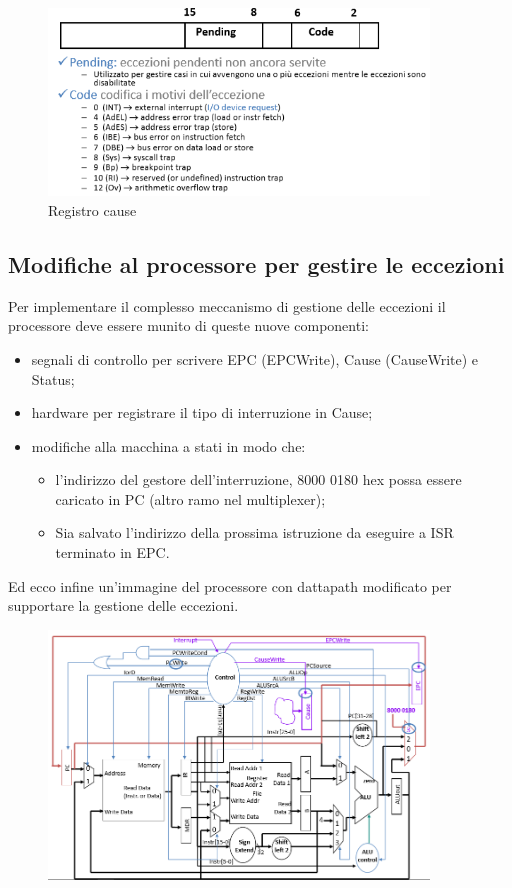 \documentclass[class=book, crop=false, oneside]{standalone}
\begin{document}
\begin{figure}[H]
	\centering
	\includegraphics[width=0.9\textwidth,keepaspectratio]{registro-cause}
	\caption{Registro cause}
\end{figure}

\subsection{Modifiche al processore per gestire le eccezioni}
Per implementare il complesso meccanismo di gestione delle eccezioni il processore deve essere munito di queste nuove componenti:
\begin{itemize}
	\item segnali di controllo per scrivere EPC (EPCWrite), Cause (CauseWrite) e Status;
	\item hardware per registrare il tipo di interruzione in Cause;
	\item modifiche alla macchina a stati in modo che:
	\begin{itemize}
		\item l’indirizzo del gestore dell’interruzione, 8000 0180 hex possa essere caricato in PC (altro ramo nel multiplexer);
		\item Sia salvato l’indirizzo della prossima istruzione da eseguire a ISR terminato in EPC.
	\end{itemize}
\end{itemize}

Ed ecco infine un'immagine del processore con dattapath modificato per supportare la gestione delle eccezioni.

\begin{figure}[H]
	\centering
	\includegraphics[width=0.9\textwidth,keepaspectratio]{final-datapath}
\end{figure}
\end{document}
